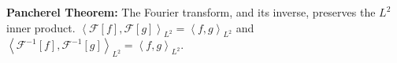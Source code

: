{\bf Pancherel Theorem:} The Fourier transform, and its inverse, preserves the $L^2$ inner product. \newline
$\left\langle\mathcal{F}[f],\mathcal{F}[g]\right\rangle_{L^2}=\left\langle f,g\right\rangle_{L^2}$ and $\left\langle\mathcal{F}^{-1}[f],\mathcal{F}^{-1}[g]\right\rangle_{L^2}=\left\langle f,g\right\rangle_{L^2}$.